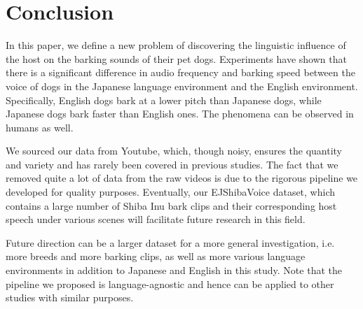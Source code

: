 \section{Conclusion}
\label{sec:conclusion}
In this paper, we define a new problem of discovering the linguistic influence of 
the host on the barking sounds of their pet dogs. Experiments have shown that there is a 
significant difference in audio frequency and barking speed between the voice of dogs 
in the Japanese language environment and the English environment. 
Specifically, English dogs bark at a lower pitch than Japanese dogs, while Japanese dogs bark
faster than English ones. The phenomena can be observed in humans as well.

We sourced our data from Youtube, which, though noisy, ensures the quantity and variety and has 
rarely been covered in previous studies. The fact that we removed quite a lot of data from
the raw videos is due to the rigorous pipeline we developed for quality purposes. 
Eventually, our EJShibaVoice dataset, which contains a large number of Shiba Inu bark clips 
and their corresponding host speech under various scenes will facilitate future research in 
this field.   

Future direction can be a larger dataset for a more general investigation, i.e. more breeds and 
more barking clips, as well as more various language environments in addition to Japanese 
and English in this study. Note that the pipeline we proposed is language-agnostic and hence 
can be applied to other studies with similar purposes. 

